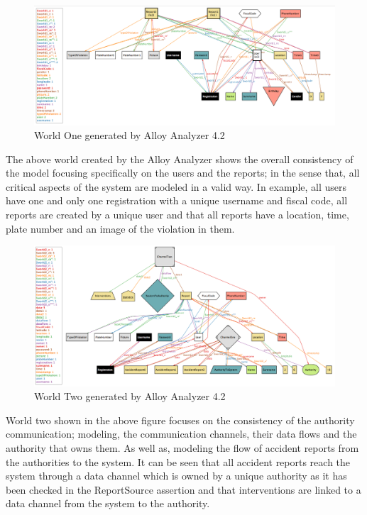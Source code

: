 	\begin{figure}[H]	
		\centering
		\includegraphics[scale=0.35]{images/World1.png}
		\caption{World One generated by Alloy Analyzer 4.2}
	\end{figure}
	
The above world created by the Alloy Analyzer shows the overall consistency of the model focusing specifically on the users and the reports; in the sense that, all critical aspects of the system are modeled in a valid way. In example, all users have one and only one registration with a unique username and fiscal code, all reports are created by a unique user and that all reports have a location, time, plate number and an image of the violation in them.	
	
	\begin{figure}[H]	
		\centering
		\includegraphics[scale=0.35]{images/World2.png}
		\caption{World Two generated by Alloy Analyzer 4.2}
	\end{figure}
	
World two shown in the above figure focuses on the consistency of the authority communication; modeling, the communication channels, their data flows and the authority that owns them. As well as, modeling the flow of accident reports from the authorities to the system. It can be seen that all accident reports reach the system through a data channel which is owned by a unique authority as it has been checked in the ReportSource assertion and that interventions are linked to a data channel from the system to the authority.
	
